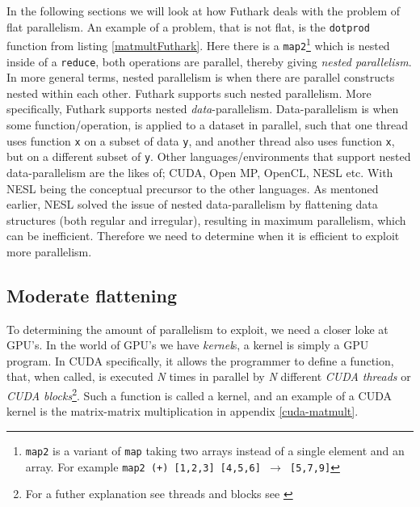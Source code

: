 In the following sections we will look at how Futhark deals with the problem of flat parallelism. An example of a problem, that is not flat, is the \texttt{dotprod} function from listing \ref{matmultFuthark}. Here there is a \texttt{map2}\footnote{\texttt{map2} is a variant of \texttt{map} taking two arrays instead of a single element and an array. For example \texttt{map2 (+) [1,2,3] [4,5,6] $\to$ [5,7,9]}} which is nested inside of a \texttt{reduce}, both operations are parallel, thereby giving \textit{nested parallelism}. In more general terms, nested parallelism is when there are parallel constructs nested within each other. Futhark supports such nested parallelism. More specifically, Futhark supports nested \textit{data}-parallelism. Data-parallelism is when some function/operation, is applied to a dataset in parallel, such that one thread uses function \texttt{x} on a subset of data \texttt{y}, and another thread also uses function \texttt{x}, but on a different subset of \texttt{y}. Other languages/environments that support nested data-parallelism are the likes of; CUDA, Open MP, OpenCL, NESL etc. With NESL being the conceptual precursor to the other languages. As mentoned earlier, NESL solved the issue of nested data-parallelism by flattening data structures (both regular and irregular), resulting in maximum parallelism, which can be inefficient. Therefore we need to determine when it is efficient to exploit more parallelism. 

\subsection{Moderate flattening}
To determining the amount of parallelism to exploit, we need a closer loke at GPU's. In the world of GPU's we have \textit{kernel}s, a kernel is simply a GPU program. In CUDA specifically, it allows the programmer to define a function, that, when called, is executed \textit{N} times in parallel by \textit{N} different \textit{CUDA threads} or \textit{CUDA blocks}\footnote{For a futher explanation see threads and blocks see \cite{prog-guide-cuda}}. Such a function is called a kernel, and an example of a CUDA kernel is the matrix-matrix multiplication in appendix \ref{cuda-matmult}. 

